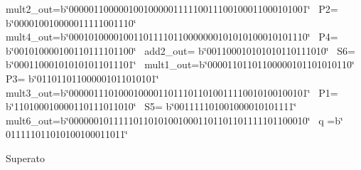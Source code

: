\begin{DoxyCompactItemize}
\begin{DoxyCompactList}
mult2\+\_\+out=b\char`\"{}000001100000100100000111110011100100011000101001\char`\"{}~\newline
 P2= b\char`\"{}000010010000011111001110\char`\"{}~\newline
 mult4\+\_\+out=b\char`\"{}000101000010011011110110000000101010100010101110\char`\"{}~\newline
 P4= b\char`\"{}001010000100110111101100\char`\"{}~\newline
 add2\+\_\+out= b\char`\"{}001100010101010110111010\char`\"{}~\newline
 S6= b\char`\"{}000110001010101011011101\char`\"{}~\newline
 mult1\+\_\+out=b\char`\"{}00001101101100000101101010110\char`\"{}~\newline
 P3= b\char`\"{}011011011000001011010101\char`\"{}~\newline
 mult3\+\_\+out=b\char`\"{}000001110100010000110111011010011110010100100101\char`\"{}~\newline
 P1= b\char`\"{}110100010000110111011010\char`\"{}~\newline
 S5= b\char`\"{}001111101001000010101111\char`\"{}~\newline
 mult6\+\_\+out=b\char`\"{}000000101111101101010010001101101101111101100010\char`\"{}~\newline
 q =b\char`\"{}       011111011010100100011011\char`\"{}  

Superato  \end{DoxyCompactList}\end{DoxyCompactItemize}



